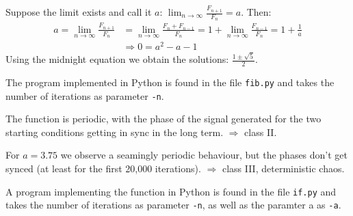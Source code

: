 \documentclass[10pt,a4paper,boxed]{hmcpset}
\begin{document}
\begin{problem}[Assignment 35]
\end{problem}
\begin{solution}
Suppose the limit exists and call it $a$: $\lim_{n \rightarrow \infty} \frac{F_{n+1}}{F_n} = a$. Then:
\begin{align*}
	a = \lim_{n \rightarrow \infty} \frac{F_{n+1}}{F_n} & = \lim_{n \rightarrow \infty} \frac{F_{n}+F_{n-1}}{F_n} = 1 + \lim_{n \rightarrow \infty} \frac{F_{n-1}}{F_n} = 1 + \frac{1}{a} \\
	& \Rightarrow 0 = a^2 - a - 1 
\end{align*}
Using the midnight equation we obtain the solutions: $\frac{1 \pm \sqrt{5}}{2}$.

The program implemented in Python is found in the file \verb|fib.py| and takes the number of iterations as parameter \verb|-n|.
\end{solution}

\begin{problem}[Assignment 36]
\end{problem}
\begin{solution}
The function is periodic, with the phase of the signal generated for the two starting conditions getting in sync in the long term. $\Rightarrow$ class II.

For $a=3.75$ we observe a seamingly periodic behaviour, but the phases don't get synced (at least for the first 20,000 iterations). $\Rightarrow$ class III, deterministic chaos.
 
A program implementing the function in Python is found in the file \verb|if.py| and takes the number of iterations as parameter \verb|-n|, as well as the paramter a as \verb|-a|.
\end{solution}
\end{document}
